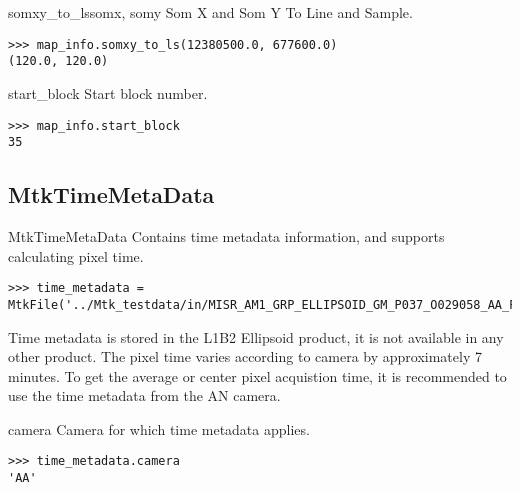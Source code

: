 \documentclass{howto}
\begin{document}
\begin{methoddesc}{somxy_to_ls}{somx, somy}
    Som X and Som Y To Line and Sample.

\begin{verbatim}
>>> map_info.somxy_to_ls(12380500.0, 677600.0)
(120.0, 120.0)
\end{verbatim}
\end{methoddesc}

\begin{memberdesc}[int]{start_block}
  Start block number.

\begin{verbatim}
>>> map_info.start_block
35
\end{verbatim}
\end{memberdesc}


\subsection{MtkTimeMetaData \label{mtktimemetadata}}


\begin{classdesc*}{MtkTimeMetaData}
  Contains time metadata information, and supports calculating pixel time.
  
\begin{verbatim}
>>> time_metadata = MtkFile('../Mtk_testdata/in/MISR_AM1_GRP_ELLIPSOID_GM_P037_O029058_AA_F03_0024.hdf').time_metadata_read()
\end{verbatim}

\begin{notice}[note]
Time metadata is stored in the L1B2 Ellipsoid product, it is not available in any other product. The pixel time varies according to camera by approximately 7 minutes. To get the average or center pixel acquistion time, it is recommended to use the time metadata from the AN camera.
\end{notice}

\end{classdesc*}

\begin{memberdesc}[char]{camera}
  Camera for which time metadata applies.
  
\begin{verbatim}
>>> time_metadata.camera  
'AA'
\end{verbatim}
\end{memberdesc}
\end{document}
